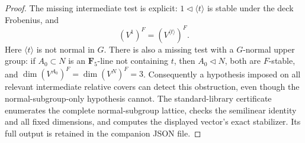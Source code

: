 \begin{proof}
The missing intermediate test is explicit:
$1\triangleleft\langle t\rangle$ is stable under the
deck Frobenius, and
\[
            (V^1)^F=(V^{\langle t\rangle})^F.
\]
Here $\langle t\rangle$ is not normal in $G$.
There is also a missing test with a $G$-normal upper group:
if $A_0\subset N$ is an $\mathbf F_5$-line not containing $t$,
then $A_0\triangleleft N$, both are $F$-stable, and
$\dim(V^{A_0})^F=\dim(V^N)^F=3$.
Consequently a hypothesis imposed on all relevant
intermediate relative covers can detect this obstruction,
even though the normal-subgroup-only hypothesis cannot.
The standard-library certificate
enumerates the complete normal-subgroup lattice,
checks the semilinear identity and all fixed dimensions,
and computes the displayed vector's exact stabilizer.
Its full output is retained in the companion JSON file.
\end{proof}


